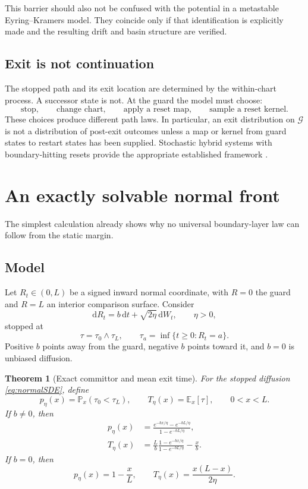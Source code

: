 \documentclass[11pt]{article}
\newtheorem{theorem}{Theorem}[section]
\theoremstyle{definition}
\theoremstyle{remark}
\newcommand{\cG}{\mathcal G}
\newcommand{\EE}{\mathbb E}
\newcommand{\PP}{\mathbb P}
\newcommand{\dd}{\mathrm d}
\begin{document}
This barrier should also not be confused with the potential in a
metastable Eyring--Kramers model.  They coincide only if that identification
is explicitly made and the resulting drift and basin structure are
verified.

\subsection{Exit is not continuation}

The stopped path and its exit location are determined by the within-chart
process.  A successor state is not.  At the guard the model must choose:
\[
 \text{stop},\qquad
 \text{change chart},\qquad
 \text{apply a reset map},\qquad
 \text{sample a reset kernel}.
\]
These choices produce different path laws.  In particular, an exit
distribution on \(\cG\) is not a distribution of post-exit outcomes unless
a map or kernel from guard states to restart states has been supplied.
Stochastic hybrid systems with boundary-hitting resets provide the
appropriate established framework
\cite{GoebelSanfeliceTeel2012,BectBailiFleury2005}.

\section{An exactly solvable normal front}
\label{sec:normal}

The simplest calculation already shows why no universal boundary-layer
law can follow from the static margin.

\subsection{Model}

Let \(R_t\in(0,L)\) be a signed inward normal coordinate, with \(R=0\) the
guard and \(R=L\) an interior comparison surface.  Consider
\begin{equation}
 \dd R_t=b\,\dd t+\sqrt{2\eta}\,\dd W_t,
 \qquad
 \eta>0,
\label{eq:normalSDE}
\end{equation}
stopped at
\[
 \tau=\tau_0\wedge\tau_L,
 \qquad
 \tau_a=\inf\{t\ge0:R_t=a\}.
\]
Positive \(b\) points away from the guard, negative \(b\) points toward it,
and \(b=0\) is unbiased diffusion.

\begin{theorem}[Exact committor and mean exit time]
\label{thm:normal}
For the stopped diffusion \eqref{eq:normalSDE}, define
\[
 p_\eta(x)=\PP_x(\tau_0<\tau_L),
 \qquad
 T_\eta(x)=\EE_x[\tau],
 \qquad 0<x<L.
\]
If \(b\ne0\), then
\begin{align}
 p_\eta(x)
 &=
 \frac{e^{-bx/\eta}-e^{-bL/\eta}}
      {1-e^{-bL/\eta}},
\label{eq:pnonzero}\\
 T_\eta(x)
 &=
 \frac{L}{b}
 \frac{1-e^{-bx/\eta}}{1-e^{-bL/\eta}}
 -
 \frac{x}{b}.
\label{eq:Tnonzero}
\end{align}
If \(b=0\), then
\begin{equation}
 p_\eta(x)=1-\frac{x}{L},
 \qquad
 T_\eta(x)=\frac{x(L-x)}{2\eta}.
\label{eq:zero}
\end{equation}
\end{theorem}
\end{document}
